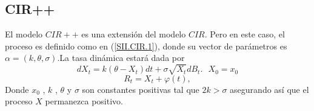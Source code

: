 \documentclass[11pt,notitlepage]{article}
\begin{document}
        \subsection{CIR++}
        El modelo \(CIR++\) es una extensión del modelo \(CIR\). Pero en este caso, el proceso  es definido como en  (\ref{SII.CIR.1}), donde su vector de parámetros es \( \alpha= (k,\theta,\sigma) \).La tasa dinámica estará dada por 
        \begin{equation}\label{SII.CIR++.0}
        dX_{t}=k\left ( \theta-X_{t} \right )dt+\sigma \sqrt{X_{t}}dB_{t}. \ \ \ X_0 = x_0    
        \end{equation}
        \begin{equation}\label{SII.CIR++.(-1)}
            R_{t}=X_{t}+\varphi (t),
        \end{equation}
        Donde \(x_{0}\) , \(k\) , \(\theta \) y \( \sigma \) son constantes positivas tal que \(2k> \sigma \)  asegurando así que el proceso \(X\) permanezca positivo.%
\end{document}
